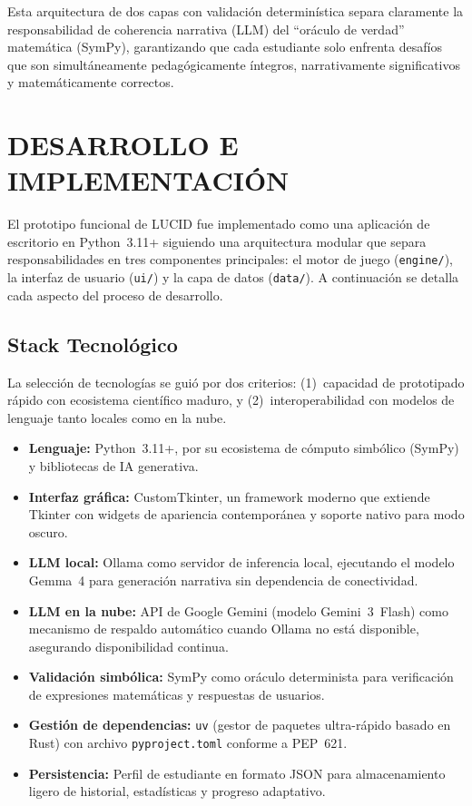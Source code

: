 \documentclass{ieeetj}
\begin{document}
Esta arquitectura de dos capas con validaci\'on determin\'istica separa claramente la responsabilidad de coherencia narrativa (LLM) del ``or\'aculo de verdad'' matem\'atica (SymPy), garantizando que cada estudiante solo enfrenta desaf\'ios que son simult\'aneamente pedag\'ogicamente \'integros, narrativamente significativos y matem\'aticamente correctos.

\section{DESARROLLO E IMPLEMENTACI\'ON}

El prototipo funcional de LUCID fue implementado como una aplicaci\'on de escritorio en Python~3.11+ siguiendo una arquitectura modular que separa responsabilidades en tres componentes principales: el motor de juego (\texttt{engine/}), la interfaz de usuario (\texttt{ui/}) y la capa de datos (\texttt{data/}). A continuaci\'on se detalla cada aspecto del proceso de desarrollo.

\subsection{Stack Tecnol\'ogico}

La selecci\'on de tecnolog\'ias se gui\'o por dos criterios: (1)~capacidad de prototipado r\'apido con ecosistema cient\'ifico maduro, y (2)~interoperabilidad con modelos de lenguaje tanto locales como en la nube.

\begin{itemize}
  \item \textbf{Lenguaje:} Python~3.11+, por su ecosistema de c\'omputo simb\'olico (SymPy) y bibliotecas de IA generativa.
  \item \textbf{Interfaz gr\'afica:} CustomTkinter, un framework moderno que extiende Tkinter con widgets de apariencia contempor\'anea y soporte nativo para modo oscuro.
  \item \textbf{LLM local:} Ollama como servidor de inferencia local, ejecutando el modelo Gemma~4 para generaci\'on narrativa sin dependencia de conectividad.
  \item \textbf{LLM en la nube:} API de Google Gemini (modelo Gemini~3~Flash) como mecanismo de respaldo autom\'atico cuando Ollama no est\'a disponible, asegurando disponibilidad continua.
  \item \textbf{Validaci\'on simb\'olica:} SymPy como or\'aculo determinista para verificaci\'on de expresiones matem\'aticas y respuestas de usuarios.
  \item \textbf{Gesti\'on de dependencias:} \texttt{uv} (gestor de paquetes ultra-r\'apido basado en Rust) con archivo \texttt{pyproject.toml} conforme a PEP~621.
  \item \textbf{Persistencia:} Perfil de estudiante en formato JSON para almacenamiento ligero de historial, estad\'isticas y progreso adaptativo.
\end{itemize}
\end{document}

